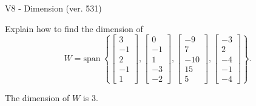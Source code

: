 \begin{exercise}
  \begin{exerciseTitle}V8 - Dimension (ver. 531)\end{exerciseTitle}
  \begin{exerciseStatement}
    Explain how to find the dimension of 
\[W=\mathrm{span}\ \left\{\left[\begin{array}{r}
3 \\
-1 \\
2 \\
-1 \\
1
\end{array}\right] , \left[\begin{array}{r}
0 \\
-1 \\
1 \\
-3 \\
-2
\end{array}\right] , \left[\begin{array}{r}
-9 \\
7 \\
-10 \\
15 \\
5
\end{array}\right] , \left[\begin{array}{r}
-3 \\
2 \\
-4 \\
-1 \\
-4
\end{array}\right]\right\}.\]



  \end{exerciseStatement}
  \begin{exerciseAnswer}
   The dimension of \(W\) is  \(3\).
  


  \end{exerciseAnswer}
\end{exercise}